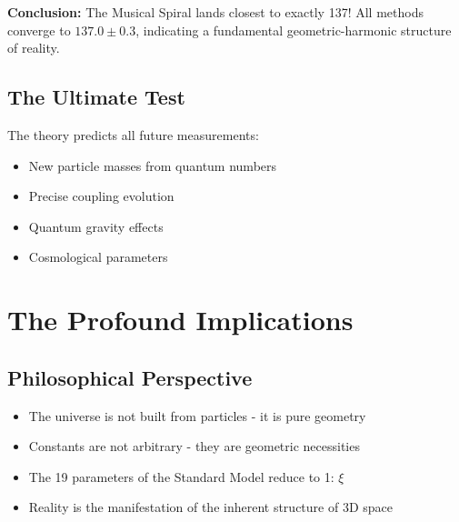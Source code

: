 \documentclass[12pt,a4paper]{article}
\theoremstyle{definition}
\begin{document}
	\begin{table}[h]
		\centering
		\caption{Detailed analysis of different approaches}
	\end{table}
	
	\textbf{Conclusion:} The Musical Spiral lands closest to exactly 137! All methods converge to $137.0 \pm 0.3$, indicating a fundamental geometric-harmonic structure of reality.
	
	\subsection{The Ultimate Test}
	
	The theory predicts all future measurements:
	\begin{itemize}
		\item New particle masses from quantum numbers
		\item Precise coupling evolution
		\item Quantum gravity effects
		\item Cosmological parameters
	\end{itemize}
	
	\section{The Profound Implications}
	
	\subsection{Philosophical Perspective}
	
	\begin{newperspective}
		\begin{itemize}
			\item The universe is not built from particles - it is pure geometry
			\item Constants are not arbitrary - they are geometric necessities
			\item The 19 parameters of the Standard Model reduce to 1: $\xi$
			\item Reality is the manifestation of the inherent structure of 3D space
		\end{itemize}
	\end{newperspective}
	
\end{document}
